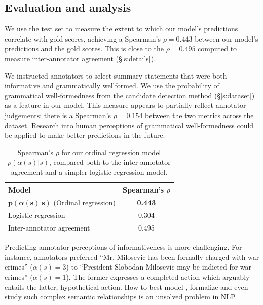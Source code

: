 \documentclass[11pt,a4paper]{article}
\begin{document}
 \subsection{Evaluation and analysis}\label{s:eval}


We use the test set to measure the extent to which our model's predictions correlate with gold scores, achieving a Spearman's $\rho=0.443$ between our model's predictions and the gold scores. This is close to the $\rho=0.495$ computed to measure inter-annotator agreement (\S\ref{s:details}). 

We instructed annotators to select summary statements that were both informative and grammatically wellformed. We use the probability of grammatical well-formedness from the candidate detection method (\S\ref{s:dataset}) as a feature in our model. This measure appears to partially reflect annotator judgements: there is a Spearman's $\rho=0.154$ between the two metrics across the dataset. Research into human perceptions of grammatical well-formedness \cite{shutzesprouse,Warstadt2018NeuralNA} could be applied to make better predictions in the future. 


\begin{table}[htb!]
\centering
\begin{tabular}{@{}lc@{}}
\toprule
Model & Spearman's $\rho $\\ \midrule
$\bm{p(\alpha(s) | s)}$ {\small (Ordinal regression)} & \textbf{0.443} \\
Logistic regression & 0.304 \\
Inter-annotator agreement &  0.495 \\
\end{tabular}
\caption{Spearman's $\rho$ for our ordinal regression model $p(\alpha(s) | s)$, compared both to the inter-annotator agreement and a simpler logistic regression model.}
\end{table}

Predicting annotator perceptions of informativeness is more challenging. For instance, annotators preferred ``Mr. Milosevic has been formally charged with war crimes'' {\small ($\alpha(s)=3$)} to ``President Slobodan Milosevic may be indicted for war crimes'' {\small ($\alpha(s)=1$)}. The former expresses a completed action which arguably entails the latter, hypothetical action. How to best model \cite{snli:emnlp2015}, formalize \cite{maccartney2009extended} and even study \cite{N18-2017} such complex semantic relationships is an unsolved problem in NLP. 
\end{document}

